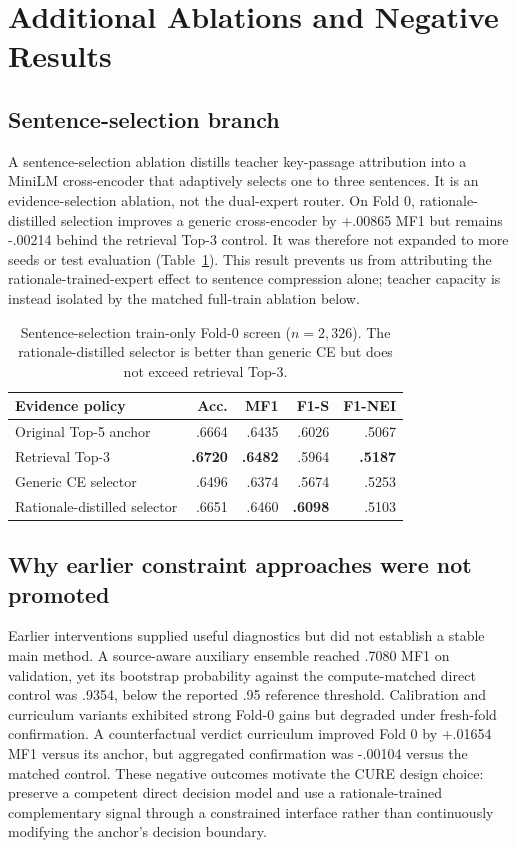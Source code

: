 \documentclass[11pt]{article}
\begin{document}
\section{Additional Ablations and Negative Results}
\subsection{Sentence-selection branch}
A sentence-selection ablation distills teacher key-passage attribution into a MiniLM cross-encoder that adaptively selects one to three sentences. It is an evidence-selection ablation, not the dual-expert router. On Fold 0, rationale-distilled selection improves a generic cross-encoder by +.00865 MF1 but remains -.00214 behind the retrieval Top-3 control. It was therefore not expanded to more seeds or test evaluation (Table~\ref{tab:selector}). This result prevents us from attributing the rationale-trained-expert effect to sentence compression alone; teacher capacity is instead isolated by the matched full-train ablation below.

\begin{table}[t]
\centering\scriptsize
\begin{tabular}{@{}lrrrr@{}}
\toprule
Evidence policy & Acc. & MF1 & F1-S & F1-NEI\\
\midrule
Original Top-5 anchor & .6664 & .6435 & .6026 & .5067\\
Retrieval Top-3 & \textbf{.6720} & \textbf{.6482} & .5964 & \textbf{.5187}\\
Generic CE selector & .6496 & .6374 & .5674 & .5253\\
Rationale-distilled selector & .6651 & .6460 & \textbf{.6098} & .5103\\
\bottomrule
\end{tabular}
\caption{Sentence-selection train-only Fold-0 screen ($n=2{,}326$). The rationale-distilled selector is better than generic CE but does not exceed retrieval Top-3.}\label{tab:selector}
\end{table}

\subsection{Why earlier constraint approaches were not promoted}
Earlier interventions supplied useful diagnostics but did not establish a stable main method. A source-aware auxiliary ensemble reached .7080 MF1 on validation, yet its bootstrap probability against the compute-matched direct control was .9354, below the reported .95 reference threshold. Calibration and curriculum variants exhibited strong Fold-0 gains but degraded under fresh-fold confirmation. A counterfactual verdict curriculum improved Fold 0 by +.01654 MF1 versus its anchor, but aggregated confirmation was -.00104 versus the matched control. These negative outcomes motivate the CURE design choice: preserve a competent direct decision model and use a rationale-trained complementary signal through a constrained interface rather than continuously modifying the anchor's decision boundary.
\end{document}
